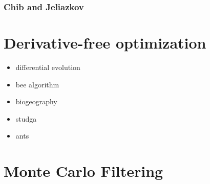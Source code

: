 \documentclass[letterpaper,10pt,english]{sphinxmanual}
\begin{document}
\subsection{Chib and Jeliazkov}
\label{mcmc:chib-and-jeliazkov}

\chapter{Derivative-free optimization}
\label{derivative_free_optimization:derivative-free-optimization}\label{derivative_free_optimization::doc}\begin{itemize}
\item {} 
differential evolution

\item {} 
bee algorithm

\item {} 
biogeography

\item {} 
studga

\item {} 
ants

\end{itemize}


\chapter{Monte Carlo Filtering}
\label{classes/utils/@mcf/mcf:monte-carlo-filtering}\label{classes/utils/@mcf/mcf::doc}
\end{document}
